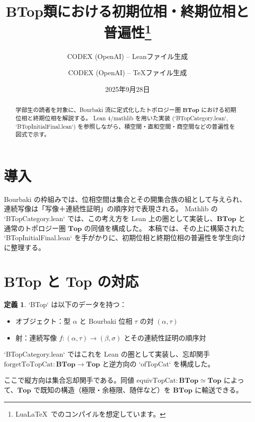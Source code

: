 \documentclass[]{jlreq}
\title{BTop類における初期位相・終期位相と普遍性\thanks{Lua\LaTeX\ でのコンパイルを想定しています。}}
\author{CODEX (OpenAI) -- Leanファイル生成 \and CODEX (OpenAI) -- TeXファイル生成}
\date{2025年9月28日}
\theoremstyle{definition}
\newtheorem{definition}{定義}
\theoremstyle{remark}
\begin{document}
\maketitle

\begin{abstract}
学部生の読者を対象に、Bourbaki 流に定式化したトポロジー圏 \(\mathbf{BTop}\) における初期位相と終期位相を解説する。
Lean 4/mathlib を用いた実装 (`BTopCategory.lean`, `BTopInitialFinal.lean`) を参照しながら、積空間・直和空間・商空間などの普遍性を図式で示す。
\end{abstract}

\tableofcontents

\section{導入}
Bourbaki の枠組みでは、位相空間は集合とその開集合族の組として与えられ、連続写像は「写像＋連続性証明」の順序対で表現される。
Mathlib の `BTopCategory.lean` では、この考え方を Lean 上の圏として実装し、$
\mathbf{BTop}$ と通常のトポロジー圏 $\mathbf{Top}$ の同値を構成した。
本稿では、その上に構築された `BTopInitialFinal.lean` を手がかりに、初期位相と終期位相の普遍性を学生向けに整理する。

\section{BTop と Top の対応}
\begin{definition}
`BTop` は以下のデータを持つ：
\begin{itemize}
  \item オブジェクト：型 \(\alpha\) と Bourbaki 位相 \(\tau\) の対 \((\alpha,\tau)\)
  \item 射：連続写像 \(f : (\alpha,\tau) \to (\beta,\sigma)\) とその連続性証明の順序対
\end{itemize}
`BTopCategory.lean` ではこれを Lean の圏として実装し、忘却関手
\(
  \mathrm{forgetToTopCat} : \mathbf{BTop} \to \mathbf{Top}
\)
と逆方向の `ofTopCat` を構成した。
\end{definition}

\begin{center}
\end{center}
ここで縦方向は集合忘却関手である。同値 $\mathrm{equivTopCat} : \mathbf{BTop} \simeq \mathbf{Top}$ によって、$\mathbf{Top}$ で既知の構造（極限・余極限、随伴など）を $\mathbf{BTop}$ に輸送できる。
\end{document}
